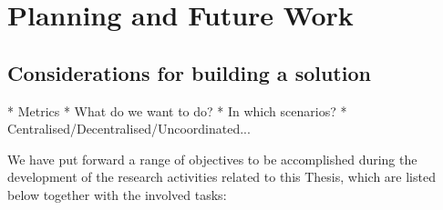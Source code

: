 \documentclass[12pt, a4paper,twoside]{tesi_upf}
\begin{document}
	\chapter{Planning and Future Work}
	\label{section:future_work}


		
\section{Considerations for building a solution}
\label{section:considerations}
* Metrics
* What do we want to do?
* In which scenarios?
* Centralised/Decentralised/Uncoordinated...

		We have put forward a range of objectives to be accomplished during the development of the research activities related to this Thesis, which are listed below together with the involved tasks:
\end{document}
